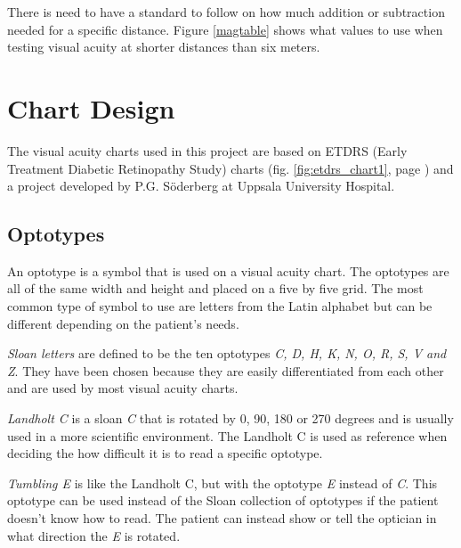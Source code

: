 \documentclass[12pt,a4paper,notitlepage]{report}
\begin{document}
There is need to have a standard to follow on how much addition or subtraction needed for a specific distance. Figure \ref{magtable} shows what values to use when testing visual acuity at shorter distances than six meters. \cite{PGSoderberg}

\section{Chart Design}
The visual acuity charts used in this project are based on ETDRS (Early Treatment Diabetic Retinopathy Study) charts (fig. \ref{fig:etdrs_chart1}, page \pageref{fig:etdrs_chart1}) \cite{Ferris} and a project developed by P.G. Söderberg \cite{PGSoderbergOral} at Uppsala University Hospital. 


\subsection{Optotypes} \label{Optotypes}
An optotype is a symbol that is used on a visual acuity chart. The optotypes are all of the same width and height and placed on a five by five grid. The most common type of symbol to use are letters from the Latin alphabet but can be different depending on the patient's needs\cite{Colenbrander}.

\textit{Sloan letters} are defined to be the ten optotypes \textit{C, D, H, K, N, O, R, S, V and Z}. They have been chosen because they are easily differentiated from each other \cite{Ferris} and are used by most visual acuity charts\cite{Colenbrander}.

\textit{Landholt C} is a sloan \textit{C} that is rotated by 0, 90, 180 or 270 degrees and is usually used in a more scientific environment. The Landholt C is used as reference when deciding the how difficult it is to read a specific optotype\cite{Colenbrander}.

\textit{Tumbling E} is like the Landholt C, but with the optotype \textit{E} instead of \textit{C}. This optotype can be used instead of the Sloan collection of optotypes if the patient doesn't know how to read. The patient can instead show or tell the optician in what direction the \textit{E} is rotated\cite{Colenbrander}.
\end{document}

